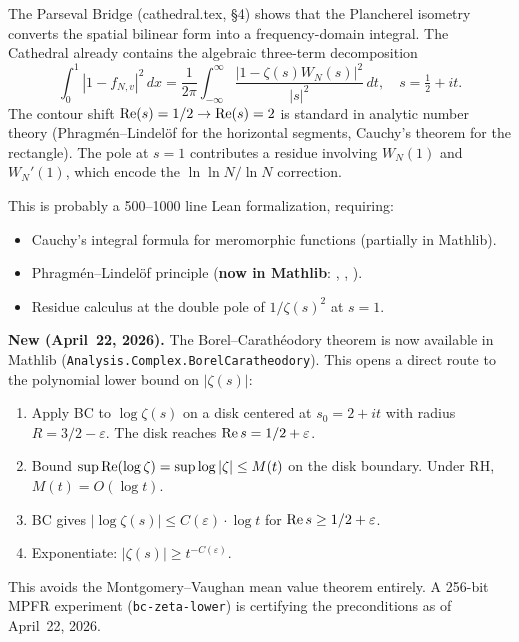 \documentclass[11pt,a4paper]{article}
\begin{document}
\begin{direction}
The Parseval Bridge (cathedral.tex, \S4) shows that the Plancherel
isometry converts the spatial bilinear form into a frequency-domain
integral. The Cathedral already contains the algebraic three-term
decomposition
\[
  \int_0^1 |1 - f_{N,v}|^2\,dx
  = \frac{1}{2\pi}\int_{-\infty}^{\infty}
    \frac{|1 - \zeta(s)W_N(s)|^2}{|s|^2}\,dt,
    \quad s = \tfrac{1}{2}+it.
\]
The contour shift $\operatorname{Re}(s) = 1/2 \to \operatorname{Re}(s) = 2$ is standard in analytic
number theory (Phragm\'en--Lindel\"of for the horizontal segments,
Cauchy's theorem for the rectangle). The pole at $s = 1$ contributes
a residue involving $W_N(1)$ and $W_N'(1)$, which encode the
$\ln\ln N/\ln N$ correction.

This is probably a 500--1000 line Lean formalization, requiring:
\begin{itemize}
  \item Cauchy's integral formula for meromorphic functions (partially in Mathlib).
  \item Phragm\'en--Lindel\"of principle (\textbf{now in Mathlib}:
    , ,
    ).
  \item Residue calculus at the double pole of $1/\zeta(s)^2$ at $s = 1$.
\end{itemize}
\end{direction}

\begin{direction}
\textbf{New (April~22, 2026).} The Borel--Carath\'eodory theorem is now
available in Mathlib (\texttt{Analysis.Complex.BorelCaratheodory}). This
opens a direct route to the polynomial lower bound on $|\zeta(s)|$:
\begin{enumerate}
  \item Apply BC to $\log\zeta(s)$ on a disk centered at $s_0 = 2+it$
    with radius $R = 3/2 - \varepsilon$. The disk reaches $\operatorname{Re} s = 1/2 + \varepsilon$.
  \item Bound $\sup \operatorname{Re}(\log\zeta) = \sup \log|\zeta| \leq M(t)$ on the
    disk boundary. Under RH, $M(t) = O(\log t)$.
  \item BC gives $|\log\zeta(s)| \leq C(\varepsilon) \cdot \log t$
    for $\operatorname{Re} s \geq 1/2 + \varepsilon$.
  \item Exponentiate: $|\zeta(s)| \geq t^{-C(\varepsilon)}$.
\end{enumerate}
This avoids the Montgomery--Vaughan mean value theorem entirely.
A 256-bit MPFR experiment (\texttt{bc-zeta-lower}) is certifying the
preconditions as of April~22, 2026.
\end{direction}
\end{document}
